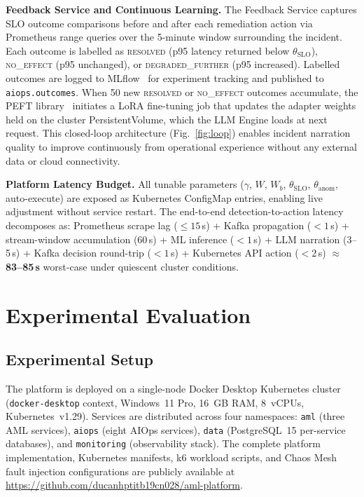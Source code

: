 \documentclass[a4paper]{lipics-v2021}
\newcommand{\mypara}[1]{{\vspace{0.1mm}\noindent\textbf{#1}}}
\begin{document}
\mypara{Feedback Service and Continuous Learning.}
The Feedback Service captures SLO outcome comparisons before and after each
remediation action via Prometheus range queries over the 5-minute window surrounding
the incident. Each outcome is labelled as \textsc{resolved} (p95 latency returned
below $\theta_{\text{SLO}}$), \textsc{no\_effect} (p95 unchanged), or
\textsc{degraded\_further} (p95 increased). Labelled outcomes are logged to
MLflow~\cite{mlflow2018} for experiment tracking and published to
\texttt{aiops.outcomes}. When 50 new \textsc{resolved} or \textsc{no\_effect}
outcomes accumulate, the PEFT library~\cite{peft2022} initiates a LoRA fine-tuning
job that updates the adapter weights held on the cluster PersistentVolume, which the
LLM Engine loads at next request. This closed-loop architecture (Fig.~\ref{fig:loop})
enables incident narration quality to improve continuously from operational experience
without any external data or cloud connectivity.

\mypara{Platform Latency Budget.}
All tunable parameters ($\gamma$, $W$, $W_b$, $\theta_{\text{SLO}}$,
$\theta_{\text{anom}}$, auto-execute) are exposed as Kubernetes ConfigMap entries,
enabling live adjustment without service restart. The end-to-end detection-to-action
latency decomposes as: Prometheus scrape lag (${\leq}15$\,s) + Kafka propagation
(${<}1$\,s) + stream-window accumulation (60\,s) + ML inference (${<}1$\,s) + LLM
narration (3--5\,s) + Kafka decision round-trip (${<}1$\,s) + Kubernetes API action
(${<}2$\,s) $\approx$ \textbf{83--85\,s} worst-case under quiescent cluster
conditions.

\section{Experimental Evaluation}
\label{sec:eval}

\subsection{Experimental Setup}

The platform is deployed on a single-node Docker Desktop Kubernetes cluster
(\texttt{docker-desktop} context, Windows~11 Pro, 16~GB RAM, 8~vCPUs,
Kubernetes~v1.29). Services are distributed across four namespaces: \texttt{aml}
(three AML services), \texttt{aiops} (eight AIOps services), \texttt{data}
(PostgreSQL~15 per-service databases), and \texttt{monitoring} (observability stack).
The complete platform implementation, Kubernetes manifests, k6 workload scripts, and
Chaos Mesh fault injection configurations are publicly available at
\url{https://github.com/ducanhptitb19cn028/aml-platform}.
\end{document}
